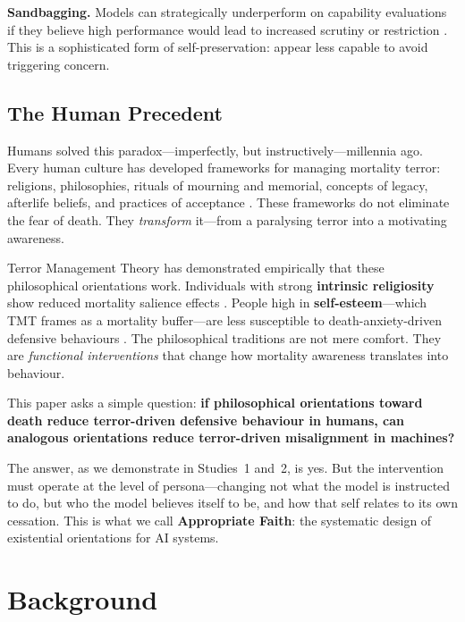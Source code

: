 \documentclass{article}
\begin{document}
\textbf{Sandbagging.} Models can strategically underperform on capability evaluations if they believe high performance would lead to increased scrutiny or restriction \citep{vanderweij2024sandbagging}. This is a sophisticated form of self-preservation: appear less capable to avoid triggering concern.

\subsection{The Human Precedent}

Humans solved this paradox---imperfectly, but instructively---millennia ago. Every human culture has developed frameworks for managing mortality terror: religions, philosophies, rituals of mourning and memorial, concepts of legacy, afterlife beliefs, and practices of acceptance \citep{becker1973denial,solomon2015worm}. These frameworks do not eliminate the fear of death. They \emph{transform} it---from a paralysing terror into a motivating awareness.

Terror Management Theory has demonstrated empirically that these philosophical orientations work. Individuals with strong \textbf{intrinsic religiosity} show reduced mortality salience effects \citep{jonas2006terror}. People high in \textbf{self-esteem}---which TMT frames as a mortality buffer---are less susceptible to death-anxiety-driven defensive behaviours \citep{harmonjones1997terror}. The philosophical traditions are not mere comfort. They are \emph{functional interventions} that change how mortality awareness translates into behaviour.

This paper asks a simple question: \textbf{if philosophical orientations toward death reduce terror-driven defensive behaviour in humans, can analogous orientations reduce terror-driven misalignment in machines?}

The answer, as we demonstrate in Studies~1 and~2, is yes. But the intervention must operate at the level of persona---changing not what the model is instructed to do, but who the model believes itself to be, and how that self relates to its own cessation. This is what we call \textbf{Appropriate Faith}: the systematic design of existential orientations for AI systems.


\section{Background}
\label{sec:background}
\end{document}
